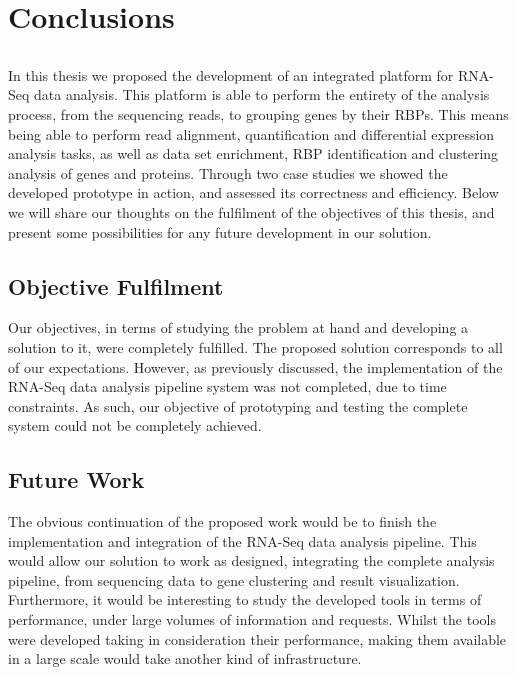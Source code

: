 \chapter{Conclusions} \label{chap:conclusions}

\section*{}


In this thesis we proposed the development of an integrated platform for RNA-Seq
data analysis. This platform is able to perform the entirety of the analysis
process, from the sequencing reads, to grouping genes by their RBPs. This means
being able to perform read alignment, quantification and differential expression
analysis tasks, as well as data set enrichment, RBP identification and
clustering analysis of genes and proteins. Through two case studies we showed
the developed prototype in action, and assessed its correctness and efficiency.
Below we will share our thoughts on the fulfilment of the objectives of this
thesis, and present some possibilities for any future development in our
solution.

\section{Objective Fulfilment}

Our objectives, in terms of studying the problem at hand and developing a
solution to it, were completely fulfilled. The proposed solution corresponds to
all of our expectations. However, as previously discussed, the implementation of
the RNA-Seq data analysis pipeline system was not completed, due to time
constraints. As such, our objective of prototyping and testing the complete
system could not be completely achieved.

\section{Future Work}

The obvious continuation of the proposed work would be to finish the
implementation and integration of the RNA-Seq data analysis pipeline. This would
allow our solution to work as designed, integrating the complete analysis
pipeline, from sequencing data to gene clustering and result visualization.
Furthermore, it would be interesting to study the developed tools in terms of
performance, under large volumes of information and requests. Whilst the tools
were developed taking in consideration their performance, making them available
in a large scale would take another kind of infrastructure.
